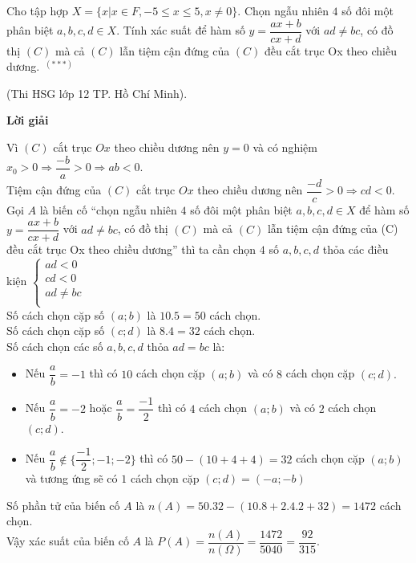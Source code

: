 \documentclass[12pt,a4paper]{report}
\begin{document}
\begin{ex}
Cho tập hợp $X = \{x | x \in F, -5 \le x \le 5, x \neq 0\}$. Chọn ngẫu nhiên $4$ số đôi một phân biệt $a,b,c,d \in X$. Tính xác suất để hàm số $y = \dfrac{ax+b}{cx+d}$ với $ad \neq bc$, có đồ thị $(C)$ mà cả $(C)$ lẫn tiệm cận đứng của $(C)$  đều cắt trục Ox theo chiều dương.$\phantom{o}^{(***)}$
\begin{flushright}
(Thi HSG lớp 12 TP. Hồ Chí Minh).
\end{flushright}
\centerline{\textbf{Lời giải}}
Vì $(C)$ cắt trục $Ox$ theo chiều dương nên $y = 0$ và có nghiệm $x_0 > 0 \Rightarrow \dfrac{-b}{a}>0  \Rightarrow ab<0$.\\
Tiệm cận đứng của $(C)$ cắt trục $Ox$ theo chiều dương nên $ \dfrac{-d}{c}>0 \Rightarrow cd<0.$\\
Gọi $A$ là biến cố ``chọn ngẫu nhiên $4$ số đôi một phân biệt $a, b, c, d \in X$ để hàm số $y = \dfrac{ax+b}{cx+d}$ với $ad \neq bc$, có đồ thị $(C)$ mà cả $(C)$ lẫn tiệm cận đứng của (C) đều cắt trục Ox theo chiều dương'' thì ta cần chọn $4$ số $a, b, c, d$ thỏa các điều kiện $\left\{ \begin{array}{l}
 ad < 0 \\ 
 cd < 0 \\ 
 ad \ne bc \\ 
 \end{array} \right.$\\
Số cách chọn cặp số $(a;b)$ là $10.5 = 50$ cách chọn.\\
Số cách chọn cặp số $(c;d)$ là $8.4 = 32$ cách chọn.\\ 
Số cách chọn các số $a, b, c, d$ thỏa $ad = bc$ là:
\begin{itemize}
\item Nếu $\dfrac{a}{b} = -1$ thì có $10$ cách chọn cặp $(a;b)$ và có $8$ cách chọn cặp $(c;d).$
\item Nếu $\dfrac{a}{b}=-2$ hoặc $ \dfrac{a}{b} = \dfrac{-1}{2}$ thì có $4$ cách chọn $(a;b)$ và có $2$ cách chọn $(c;d)$.
\item Nếu $\dfrac{a}{b} \notin \lbrace \dfrac{-1}{2};-1;-2 \rbrace$ thì có $50 - (10 +4 +4) = 32$ cách chọn cặp $(a;b)$ và tương ứng sẽ có $1$ cách chọn cặp $(c;d) = (-a;-b)$ 
\end{itemize} 
Số phần tử của biến cố $A$ là $n(A) = 50.32 - (10.8 + 2.4.2 + 32) = 1472$ cách chọn.\\
Vậy xác suất của biến cố $A$ là $P(A) = \dfrac{n(A)}{n(\Omega)}= \dfrac{1472}{5040} = \dfrac{92}{315}$.
\end{ex}
\end{document}
